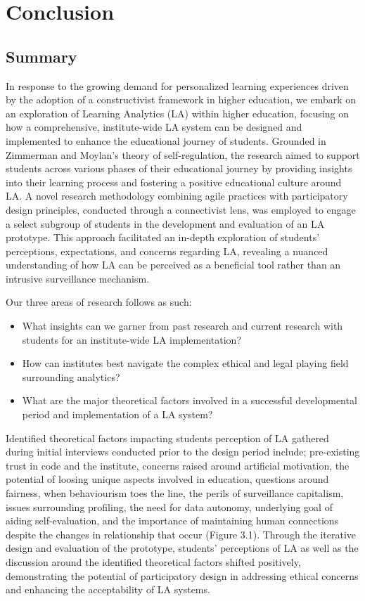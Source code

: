 \documentclass{l4proj}
\begin{document}
\chapter{Conclusion}    

\section{Summary}

In response to the growing demand for personalized learning experiences driven by the adoption of a constructivist framework in higher education,  we embark on an exploration of Learning Analytics (LA) within higher education, focusing on how a comprehensive, institute-wide LA system can be designed and implemented to enhance the educational journey of students. Grounded in Zimmerman and Moylan's theory of self-regulation, the research aimed to support students across various phases of their educational journey by providing insights into their learning process and fostering a positive educational culture around LA. A novel research methodology  combining agile practices with participatory design principles, conducted through a connectivist lens, was employed to engage a select subgroup of students in the development and evaluation of an LA prototype. This approach facilitated an in-depth exploration of students' perceptions, expectations, and concerns regarding LA, revealing a nuanced understanding of how LA can be perceived as a beneficial tool rather than an intrusive surveillance mechanism. 

Our three areas of research follows as such:

\begin{itemize}
    \item What insights can we garner from past research and current research with students for an institute-wide LA implementation?
    \item How can institutes best navigate the complex ethical and legal playing field surrounding analytics?
    \item What are the major theoretical factors involved in a successful developmental period and implementation of a LA system? 
    
\end{itemize}

Identified theoretical factors impacting students perception of LA gathered during initial interviews conducted prior to the design period include; pre-existing trust in code and the institute, concerns raised around artificial motivation, the potential of loosing unique aspects involved in education, questions around fairness, when behaviourism toes the line, the perils of surveillance capitalism, issues surrounding profiling, the need for data autonomy, underlying goal of aiding self-evaluation, and the importance of maintaining human connections despite the changes in relationship that occur (Figure 3.1). Through the iterative design and evaluation of the prototype, students' perceptions of LA as well as the discussion around the identified theoretical factors shifted positively, demonstrating the potential of participatory design in addressing ethical concerns and enhancing the acceptability of LA systems.
\end{document}
